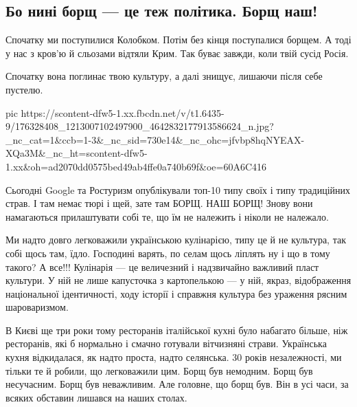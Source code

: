  
 
 
 
 
\subsection{Бо нині борщ — це теж політика. Борщ наш!}
\label{sec:20_04_2021.fb.sokyra_space.1.borsch}

Спочатку ми поступилися Колобком. Потім без кінця поступалися борщем. А тоді у
нас з кров'ю й сльозами відтяли Крим. Так буває завжди, коли твій сусід Росія.

Спочатку вона поглинає твою культуру, а далі знищує, лишаючи після себе
пустелю.

\ifcmt
  pic https://scontent-dfw5-1.xx.fbcdn.net/v/t1.6435-9/176328408_1213007102497900_4642832177913586624_n.jpg?_nc_cat=1&ccb=1-3&_nc_sid=730e14&_nc_ohc=jfvbp8hqNYEAX-XQa3M&_nc_ht=scontent-dfw5-1.xx&oh=ad2070dd0575bed49ab4ffe0a740b69f&oe=60A6C416
\fi


Сьогодні Google та Ростуризм опублікували топ-10 типу своїх і типу традиційних
страв. І там немає тюрі і щей, зате там БОРЩ. НАШ БОРЩ! Знову вони намагаються
прилаштувати собі те, що їм не належить і ніколи не належало.

Ми надто довго легковажили українською кулінарією, типу це й не культура, так
собі щось там, їдло. Господині варять, по селам щось ліплять ну і що в тому
такого? А все!!! Кулінарія — це величезний і надзвичайно важливий пласт
культури. У ній не лише капусточка з картопелькою — у ній, якраз, відображення
національної ідентичності, ходу історії і справжня культура без ураження рясним
шароваризмом. 

В Києві ще три роки тому ресторанів італійської кухні було набагато більше, ніж
ресторанів, які б нормально і смачно готували вітчизняні страви. Українська
кухня відкидалася, як надто проста, надто селянська. 30 років незалежності, ми
тільки те й робили, що легковажили цим. Борщ був немодним. Борщ був несучасним.
Борщ був неважливим. Але головне, що борщ був. Він в усі часи, за всяких
обставин лишався на наших столах. 

